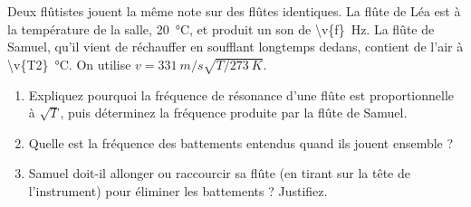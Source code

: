 Deux flûtistes jouent la même note sur des flûtes identiques. La flûte de Léa est à la température de la salle, \qty{20}{\degreeCelsius}, et produit un son de \qty{\v{f}}{Hz}. La flûte de Samuel, qu'il vient de réchauffer en soufflant longtemps dedans, contient de l'air à \qty{\v{T2}}{\degreeCelsius}. On utilise $v = \qty{331}{m/s}\sqrt{T/\qty{273}{K}}$.

\begin{enumerate}[label=\alph*)]
    \item Expliquez pourquoi la fréquence de résonance d'une flûte est proportionnelle à $\sqrt{T}$, puis déterminez la fréquence produite par la flûte de Samuel.
    \item Quelle est la fréquence des battements entendus quand ils jouent ensemble ?
    \item Samuel doit-il allonger ou raccourcir sa flûte (en tirant sur la tête de l'instrument) pour éliminer les battements ? Justifiez.
\end{enumerate}

